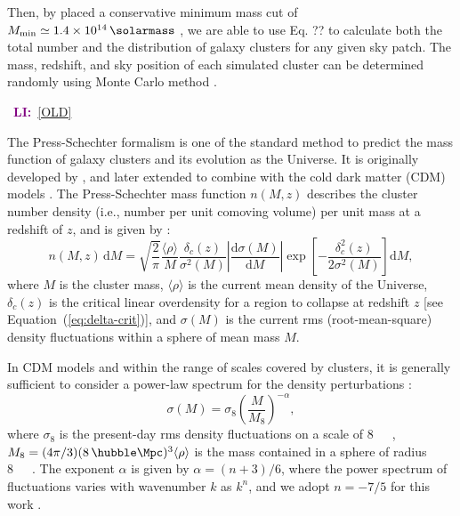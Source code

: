 \documentclass[modern]{aastex61}
\newcommand{\R}[1]{\mathrm{#1}}
\newcommand{\D}[1]{\R{d} #1}
\newcommand{\diff}[2]{\frac{\D{#1}}{\D{#2}}}
\newcommand{\LI}[1]{\textcolor{purple}{\textbf{LI:}}~\uline{#1}}
\begin{document}
Then, by placed a conservative minimum mass cut of $M_{\R{min}} \simeq
\SI{1.4e14}{\solarmass}$ \citep{zandanel2014},
we are able to use Eq. ?? to calculate both the total number and the
distribution of galaxy clusters for any given sky patch.
The mass, redshift, and sky position of each simulated cluster can be
determined randomly using Monte Carlo method \citep{wang2010}.

\noindent\hrulefill~\LI{[OLD]}~\hrulefill

The Press-Schechter formalism is one of the standard method to predict
the mass function of galaxy clusters and its evolution as the Universe.
It is originally developed by \citet{press1974}, and later extended to
combine with the cold dark matter (CDM) models
\citep[e.g.,][]{bond1991,lacey1993}.
The Press-Schechter mass function $n(M, z)$ describes the cluster
number density (i.e., number per unit comoving volume) per unit mass
at a redshift of $z$, and is given by \citep{press1974}:
\begin{equation}
  \label{eq:ps-mass-func}
  n(M, z) \,\D{M} = \sqrt{\frac{2}{\pi}} \frac{\langle{\rho}\rangle}{M}
  \frac{\delta_c(z)}{\sigma^2(M)} \left| \diff{\sigma(M)}{M} \right|
  \exp\!\left[ -\frac{\delta_c^2(z)}{2\sigma^2(M)} \right] \D{M},
\end{equation}
where
$M$ is the cluster mass,
$\langle {\rho} \rangle$ is the current mean density of the Universe,
$\delta_c(z)$ is the critical linear overdensity for a region to collapse
at redshift $z$ [see Equation~(\ref{eq:delta-crit})],
and $\sigma(M)$ is the current rms (root-mean-square) density fluctuations
within a sphere of mean mass $M$.

In CDM models and within the range of scales covered by clusters,
it is generally sufficient to consider a power-law spectrum
for the density perturbations \citep{sarazin2002,randall2002}:
\begin{equation}
  \label{eq:sigma-mass}
  \sigma(M) = \sigma_8 \left( \frac{M}{M_8} \right)^{-\alpha},
\end{equation}
where $\sigma_8$ is the present-day rms density fluctuations on a
scale of \SI{8}{\per\hubble\Mpc},
$M_8 = (4\pi/3)(8 \,\si{\per\hubble\Mpc})^3 \langle{\rho}\rangle$
is the mass contained in a sphere of radius \SI{8}{\per\hubble\Mpc}.
The exponent $\alpha$ is given by $\alpha = (n+3)/6$, where
the power spectrum of fluctuations varies with wavenumber $k$
as $k^n$, and we adopt $n = -7/5$ for this work \citep{randall2002}.
\end{document}
